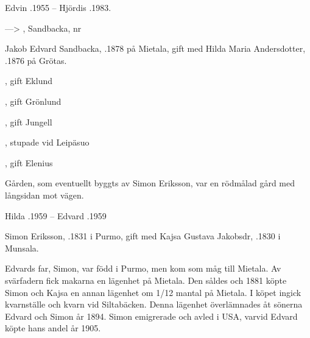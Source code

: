 Edvin .1955  --  Hjördis .1983.


--->	, Sandbacka, nr 

Jakob Edvard Sandbacka, .1878 på Mietala, gift med Hilda Maria Andersdotter, .1876 på Grötas.
\begin{jhchildren}
  \item {}
  \item {}
  \item {}
  \item {}, gift Eklund
  \item {}, gift Grönlund
  \item {}
  \item {}, gift Jungell
  \item {}, stupade vid Leipäsuo
  \item {}, gift Elenius
\end{jhchildren}
Gården, som eventuellt byggts av Simon Eriksson, var en rödmålad gård med långsidan mot vägen.

Hilda .1959  --  Edvard .1959


Simon Eriksson,  .1831 i Purmo, gift med Kajsa Gustava Jakobsdr, .1830 i Munsala.
\begin{jhchildren}
  \item {}
  \item {}
  \item {}
  \item {}
  \item {}
\end{jhchildren}
Edvards far, Simon, var född i Purmo, men kom som måg till Mietala. Av svärfadern fick makarna en lägenhet på Mietala. Den såldes och 1881 köpte Simon och Kajsa en annan lägenhet om 1/12 mantal på Mietala. I köpet ingick kvarnställe och kvarn vid Siltabäcken. Denna lägenhet överlämnades åt sönerna Edvard och Simon år 1894. Simon emigrerade och avled i USA, varvid Edvard köpte hans andel år 1905.

